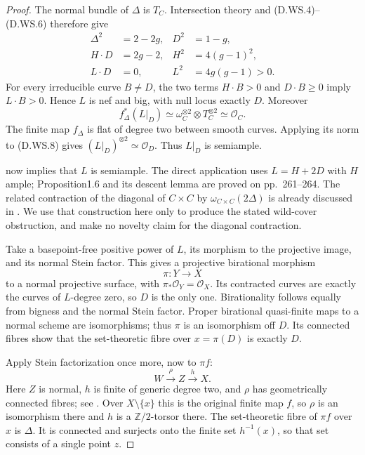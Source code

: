 \begin{proof}
The normal bundle of $\Delta$ is $T_C$. Intersection theory and
(D.WS.4)--(D.WS.6) therefore give
\[
 \begin{aligned}
 \Delta^2&=2-2g,& D^2&=1-g,\\
 H\cdot D&=2g-2,& H^2&=4(g-1)^2,\\
 L\cdot D&=0,& L^2&=4g(g-1)>0.
 \end{aligned}                                           \tag{D.WS.7}
\]
For every irreducible curve $B\ne D$, the two terms
$H\cdot B>0$ and $D\cdot B\geq0$ imply $L\cdot B>0$.
Hence $L$ is nef and big, with null locus exactly $D$.
Moreover
\[
 f_\Delta^*(L|_D)
       \simeq\omega_C^{\otimes2}\otimes T_C^{\otimes2}
       \simeq\mathcal O_C.
                                                        \tag{D.WS.8}
\]
The finite map $f_\Delta$ is flat of degree two between smooth
curves. Applying its norm to (D.WS.8) gives
$(L|_D)^{\otimes2}\simeq\mathcal O_D$. Thus $L|_D$ is semiample.

\citet[Theorem0.2, or directly Proposition1.6 with the effective
Cartier divisor $2D$]{C_Keel1999WildSwap} now implies that $L$ is
semiample. The direct application uses $L=H+2D$ with $H$ ample;
Proposition1.6 and its descent lemma are proved on pp.~261--264.
The related contraction of the diagonal of $C\times C$ by
$\omega_{C\times C}(2\Delta)$ is already discussed in
\citet[Section3, Theorem3.0 and Lemma3.2]{C_Keel1999WildSwap}.
We use that construction here only to produce the stated wild-cover
obstruction, and make no novelty claim for the diagonal contraction.

Take a basepoint-free positive power of $L$, its morphism to the
projective image, and its normal Stein factor. This gives a
projective birational morphism
\[
                  \pi:Y\longrightarrow X
                                                        \tag{D.WS.9}
\]
to a normal projective surface, with $\pi_*\mathcal O_Y=\mathcal O_X$.
Its contracted curves are exactly the curves of $L$-degree zero,
so $D$ is the only one. Birationality follows equally from bigness
and the normal Stein factor. Proper birational quasi-finite maps
to a normal scheme are isomorphisms; thus $\pi$ is an isomorphism
off $D$. Its connected fibres show that the set-theoretic fibre
over $x=\pi(D)$ is exactly $D$.

Apply Stein factorization once more, now to $\pi f$:
\[
             W\xrightarrow{\rho} Z\xrightarrow{h}X.
                                                        \tag{D.WS.10}
\]
Here $Z$ is normal, $h$ is finite of generic degree two, and
$\rho$ has geometrically connected fibres; see
\citet[Tag03H0, complete Noetherian Stein-factorization theorem]
{C_StacksWildSwap}. Over $X\setminus\{x\}$ this is the original
finite map $f$, so $\rho$ is an isomorphism there and $h$ is a
$\mathbb Z/2$-torsor there. The set-theoretic fibre of $\pi f$
over $x$ is $\Delta$. It is connected and surjects onto the finite
set $h^{-1}(x)$, so that set consists of a single point $z$.


\end{proof}
